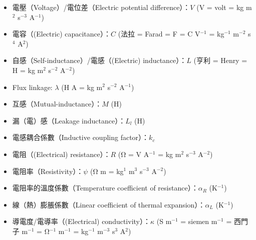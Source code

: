 \documentclass[a4paper,12pt]{report}
\begin{document}
\begin{itemize}
\begin{itemize}
\item 電壓（Voltage）/電位差（Electric potential difference）：$V$ (V = volt = kg m$^2$ s$^{-3}$ A$^{-1}$)
\item 電容（(Electric) capacitance）：$C$ (法拉 = Farad = F = C V$^{-1}$ = kg$^{-1}$ m$^{-2}$ s$^4$ A$^2$)
\item 自感（Self-inductance）/電感（(Electric) inductance）：$L$ (亨利 = Henry = H = kg m$^2$ s$^{-2}$ A$^{-2}$)
\item Flux linkage: $\lambda$ (H A = kg m$^2$ s$^{-2}$ A$^{-1}$)
\item 互感（Mutual-inductance）：$M$ (H)
\item 漏（電）感（Leakage inductance）：$L_l$ (H)
\item 電感耦合係數（Inductive coupling factor）：$k_c$
\item 電阻（(Electrical) resistance）：$R$ (Ω = V A$^{-1}$ = kg m$^2$ s$^{-3}$ A$^{-2}$)
\item 電阻率（Resistivity）：$\psi$ (Ω m = kg$^1$ m$^3$ s$^{-3}$ A$^{-2}$)
\item 電阻率的溫度係數（Temperature coefficient of resistance）：$\alpha_R$ (K$^{-1}$)
\item 線（熱）膨脹係數（Linear coefficient of thermal expansion）：$\alpha_L$ (K$^{-1}$)
\item 導電度/電導率（(Electrical) conductivity）：$\kappa$ (S m$^{-1}$ = siemen m$^{-1}$ = 西門子 m$^{-1}$ = Ω$^{-1}$ m$^{-1}$ = kg$^{-1}$ m$^{-3}$ s$^3$ A$^2$)
\end{itemize}

\end{itemize}
\end{document}
